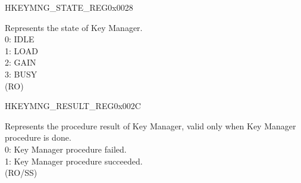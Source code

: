 \begin{register}{H}{KEYMNG\_STATE\_REG}{0x0028}\label{regdesc:KEYMNGSTATEREG}
%
%
\regnewline%
\begin{regdesc}\begin{reglist}
\label{fielddesc:KEYMNGSTATE}\item [KEYMNG\_STATE] Represents the state of Key Manager. \\
0: IDLE\\
1: LOAD\\
2: GAIN\\
3: BUSY\\
(RO)
\end{reglist}\end{regdesc}
\end{register}


\begin{register}{H}{KEYMNG\_RESULT\_REG}{0x002C}\label{regdesc:KEYMNGRESULTREG}
%
%
\regnewline%
\begin{regdesc}\begin{reglist}
\label{fielddesc:KEYMNGPROCRESULT}\item [KEYMNG\_PROC\_RESULT] Represents the procedure result of Key Manager, valid only when Key Manager procedure is done.\\
0: Key Manager procedure failed.\\
1: Key Manager procedure succeeded. \\
(RO/SS)
\end{reglist}\end{regdesc}
\end{register}


